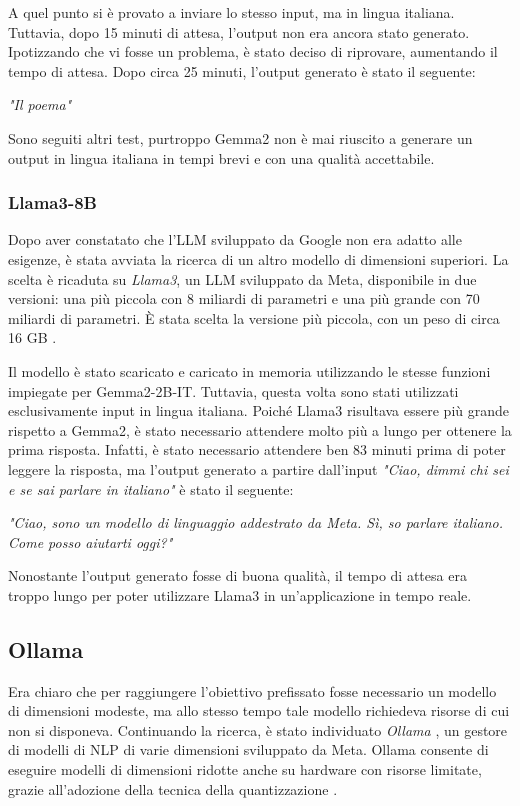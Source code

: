 A quel punto si è provato a inviare lo stesso input, ma in lingua italiana. Tuttavia, dopo 15 minuti di attesa, l'output non era ancora stato generato. Ipotizzando che vi fosse un problema, è stato deciso di riprovare, aumentando il tempo di attesa. Dopo circa 25 minuti, l'output generato è stato il seguente:
\begin{center}
    \textit{"Il poema"}
\end{center}
Sono seguiti altri test, purtroppo Gemma2 non è mai riuscito a generare un output in lingua italiana in tempi brevi e con una qualità accettabile.

\subsubsection{Llama3-8B}
Dopo aver constatato che l'LLM sviluppato da Google non era adatto alle esigenze, è stata avviata la ricerca di un altro modello di dimensioni superiori. La scelta è ricaduta su \textit{Llama3}, un LLM sviluppato da Meta, disponibile in due versioni: una più piccola con 8 miliardi di parametri e una più grande con 70 miliardi di parametri. È stata scelta la versione più piccola, con un peso di circa 16 GB \cite{llama38b}.

Il modello è stato scaricato e caricato in memoria utilizzando le stesse funzioni impiegate per Gemma2-2B-IT. Tuttavia, questa volta sono stati utilizzati esclusivamente input in lingua italiana. Poiché Llama3 risultava essere più grande rispetto a Gemma2, è stato necessario attendere molto più a lungo per ottenere la prima risposta. Infatti, è stato necessario attendere ben 83 minuti prima di poter leggere la risposta, ma l'output generato a partire dall'input \textit{"Ciao, dimmi chi sei e se sai parlare in italiano"} è stato il seguente:
\begin{center}
    \textit{"Ciao, sono un modello di linguaggio addestrato da Meta. Sì, so parlare italiano. Come posso aiutarti oggi?"}
\end{center}
Nonostante l'output generato fosse di buona qualità, il tempo di attesa era troppo lungo per poter utilizzare Llama3 in un'applicazione in tempo reale.

\subsection{Ollama}
Era chiaro che per raggiungere l'obiettivo prefissato fosse necessario un modello di dimensioni modeste, ma allo stesso tempo tale modello richiedeva risorse di cui non si disponeva. Continuando la ricerca, è stato individuato \textit{Ollama} \cite{ollamasite, ollamagithub}, un gestore di modelli di NLP di varie dimensioni sviluppato da Meta. Ollama consente di eseguire modelli di dimensioni ridotte anche su hardware con risorse limitate, grazie all'adozione della tecnica della quantizzazione \cite{quantization}.

